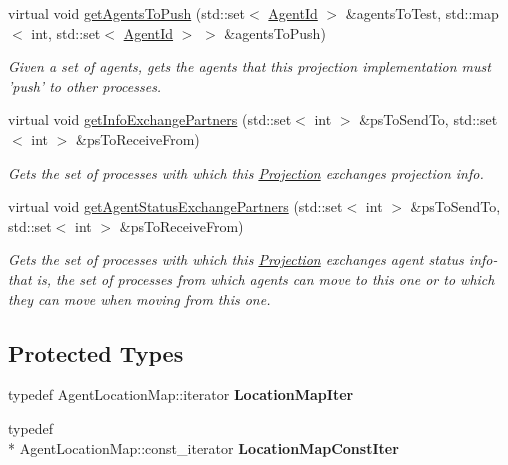 \begin{DoxyCompactItemize}
\item 
virtual void \hyperlink{classrepast_1_1_base_grid_a8f718ade5af8285f71151eea824ce3cd}{get\-Agents\-To\-Push} (std\-::set$<$ \hyperlink{classrepast_1_1_agent_id}{Agent\-Id} $>$ \&agents\-To\-Test, std\-::map$<$ int, std\-::set$<$ \hyperlink{classrepast_1_1_agent_id}{Agent\-Id} $>$ $>$ \&agents\-To\-Push)
\begin{DoxyCompactList}\small\item\em Given a set of agents, gets the agents that this projection implementation must 'push' to other processes. \end{DoxyCompactList}\item 
virtual void \hyperlink{classrepast_1_1_base_grid_a9bbbd16324d70e859dea27feebed3f58}{get\-Info\-Exchange\-Partners} (std\-::set$<$ int $>$ \&ps\-To\-Send\-To, std\-::set$<$ int $>$ \&ps\-To\-Receive\-From)
\begin{DoxyCompactList}\small\item\em Gets the set of processes with which this \hyperlink{classrepast_1_1_projection}{Projection} exchanges projection info. \end{DoxyCompactList}\item 
virtual void \hyperlink{classrepast_1_1_base_grid_ab77e5a4fba771e92b141f03f566b2a11}{get\-Agent\-Status\-Exchange\-Partners} (std\-::set$<$ int $>$ \&ps\-To\-Send\-To, std\-::set$<$ int $>$ \&ps\-To\-Receive\-From)
\begin{DoxyCompactList}\small\item\em Gets the set of processes with which this \hyperlink{classrepast_1_1_projection}{Projection} exchanges agent status info-\/ that is, the set of processes from which agents can move to this one or to which they can move when moving from this one. \end{DoxyCompactList}\end{DoxyCompactItemize}
\subsection*{Protected Types}
\begin{DoxyCompactItemize}
\item 
\hypertarget{classrepast_1_1_base_grid_acd798e07433e8da414ea2c9ce689f767}{typedef Agent\-Location\-Map\-::iterator {\bfseries Location\-Map\-Iter}}\label{classrepast_1_1_base_grid_acd798e07433e8da414ea2c9ce689f767}

\item 
\hypertarget{classrepast_1_1_base_grid_a42588a88a435a0d3447c4752dd05b3ff}{typedef \\*
Agent\-Location\-Map\-::const\-\_\-iterator {\bfseries Location\-Map\-Const\-Iter}}\label{classrepast_1_1_base_grid_a42588a88a435a0d3447c4752dd05b3ff}

\end{DoxyCompactItemize}

